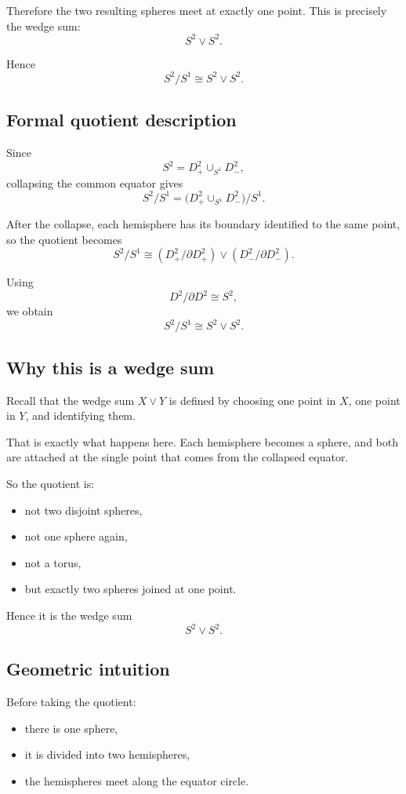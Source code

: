 \documentclass[12pt,a4paper]{article}
\theoremstyle{notespace}
\begin{document}
Therefore the two resulting spheres meet at exactly one point. This is precisely the wedge sum:
\[
S^2 \vee S^2.
\]

Hence
\[
S^2/S^1 \cong S^2 \vee S^2.
\]

\subsection{Formal quotient description}

Since
\[
S^2 = D^2_+ \cup_{S^1} D^2_-,
\]
collapsing the common equator gives
\[
S^2/S^1
=
\bigl(D^2_+ \cup_{S^1} D^2_-\bigr)/S^1.
\]

After the collapse, each hemisphere has its boundary identified to the same point, so the quotient becomes
\[
S^2/S^1
\cong
(D^2_+/\partial D^2_+) \vee (D^2_-/\partial D^2_-).
\]

Using
\[
D^2/\partial D^2 \cong S^2,
\]
we obtain
\[
S^2/S^1 \cong S^2 \vee S^2.
\]

\subsection{Why this is a wedge sum}

Recall that the wedge sum \(X\vee Y\) is defined by choosing one point in \(X\), one point in \(Y\), and identifying them.

That is exactly what happens here. Each hemisphere becomes a sphere, and both are attached at the single point that comes from the collapsed equator.

So the quotient is:
\begin{itemize}
	\item not two disjoint spheres,
	\item not one sphere again,
	\item not a torus,
	\item but exactly two spheres joined at one point.
\end{itemize}

Hence it is the wedge sum
\[
S^2 \vee S^2.
\]

\subsection{Geometric intuition}

Before taking the quotient:
\begin{itemize}
	\item there is one sphere,
	\item it is divided into two hemispheres,
	\item the hemispheres meet along the equator circle.
\end{itemize}
\end{document}
